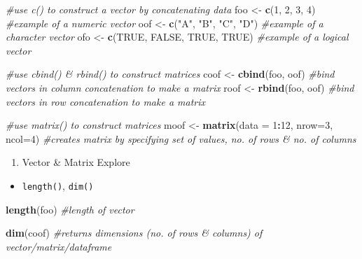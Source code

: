 \documentclass[]{book}
\newenvironment{Shaded}{\begin{snugshade}}{\end{snugshade}}
\newcommand{\CommentTok}[1]{\textcolor[rgb]{0.56,0.35,0.01}{\textit{#1}}}
\newcommand{\DataTypeTok}[1]{\textcolor[rgb]{0.13,0.29,0.53}{#1}}
\newcommand{\DecValTok}[1]{\textcolor[rgb]{0.00,0.00,0.81}{#1}}
\newcommand{\KeywordTok}[1]{\textcolor[rgb]{0.13,0.29,0.53}{\textbf{#1}}}
\newcommand{\NormalTok}[1]{#1}
\newcommand{\OperatorTok}[1]{\textcolor[rgb]{0.81,0.36,0.00}{\textbf{#1}}}
\newcommand{\OtherTok}[1]{\textcolor[rgb]{0.56,0.35,0.01}{#1}}
\newcommand{\StringTok}[1]{\textcolor[rgb]{0.31,0.60,0.02}{#1}}
\providecommand{\tightlist}{%
  \setlength{\itemsep}{0pt}\setlength{\parskip}{0pt}}
\begin{document}
\begin{Shaded}
\begin{Highlighting}[]
\CommentTok{#use c() to construct a vector by concatenating data}
\NormalTok{foo <-}\StringTok{ }\KeywordTok{c}\NormalTok{(}\DecValTok{1}\NormalTok{, }\DecValTok{2}\NormalTok{, }\DecValTok{3}\NormalTok{, }\DecValTok{4}\NormalTok{) }\CommentTok{#example of a numeric vector}
\NormalTok{oof <-}\StringTok{ }\KeywordTok{c}\NormalTok{(}\StringTok{"A"}\NormalTok{, }\StringTok{"B"}\NormalTok{, }\StringTok{"C"}\NormalTok{, }\StringTok{"D"}\NormalTok{) }\CommentTok{#example of a character vector}
\NormalTok{ofo <-}\StringTok{ }\KeywordTok{c}\NormalTok{(}\OtherTok{TRUE}\NormalTok{, }\OtherTok{FALSE}\NormalTok{, }\OtherTok{TRUE}\NormalTok{, }\OtherTok{TRUE}\NormalTok{) }\CommentTok{#example of a logical vector}

\CommentTok{#use cbind() & rbind() to construct matrices}
\NormalTok{coof <-}\StringTok{ }\KeywordTok{cbind}\NormalTok{(foo, oof) }\CommentTok{#bind vectors in column concatenation to make a matrix}
\NormalTok{roof <-}\StringTok{ }\KeywordTok{rbind}\NormalTok{(foo, oof) }\CommentTok{#bind vectors in row concatenation to make a matrix}

\CommentTok{#use matrix() to construct matrices}
\NormalTok{moof <-}\StringTok{ }\KeywordTok{matrix}\NormalTok{(}\DataTypeTok{data =} \DecValTok{1}\OperatorTok{:}\DecValTok{12}\NormalTok{, }\DataTypeTok{nrow=}\DecValTok{3}\NormalTok{, }\DataTypeTok{ncol=}\DecValTok{4}\NormalTok{) }\CommentTok{#creates matrix by specifying set of values, no. of rows & no. of columns}
\end{Highlighting}
\end{Shaded}

\begin{enumerate}
\def\labelenumi{\arabic{enumi}.}
\setcounter{enumi}{9}
\tightlist
\item
  Vector \& Matrix Explore
\end{enumerate}

\begin{itemize}
\tightlist
\item
  \texttt{length()}, \texttt{dim()}
\end{itemize}

\begin{Shaded}
\begin{Highlighting}[]
\KeywordTok{length}\NormalTok{(foo) }\CommentTok{#length of vector}

\KeywordTok{dim}\NormalTok{(coof) }\CommentTok{#returns dimensions (no. of rows & columns) of vector/matrix/dataframe}
\end{Highlighting}
\end{Shaded}
\end{document}
